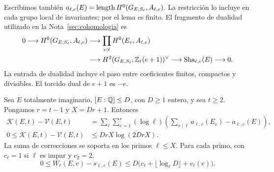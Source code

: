 Escribimos también
$a_{\ell,e}(E)=\operatorname{length} H^0(G_{E,S_\ell},A_{\ell,e})$.
La restricción lo incluye en cada grupo local de invariantes;
por el lema es finito. El fragmento de dualidad utilizado en la
Nota~\ref{sec:cohomologia} es
\begin{equation}
 \begin{split}
 0\longrightarrow H^0(G_{E,S_\ell},A_{\ell,e})
 &\longrightarrow\prod_{v\mid\ell}H^0(E_v,A_{\ell,e})\\
 &\longrightarrow H^2(G_{E,S_\ell},\mathbb{Z}_\ell(e+1))^\vee
 \longrightarrow\operatorname{Sha}_{\ell,e}(E)
 \longrightarrow0.
 \end{split}
 \label{eq:fu-dualidad}
\end{equation}
La entrada de dualidad incluye el paso entre coeficientes finitos,
compactos y divisibles. El torcido dual de $e+1$ es $-e$.

\begin{proposicion}
\label{prop:fu-presupuesto-exacto}
Sea $E$ totalmente imaginario, $[E:\mathbb{Q}]\le D$, con $D\ge1$ entero,
y sea $t\ge2$. Pongamos $r=t-1$ y $X=Dr+1$. Entonces
\begin{equation}
 \begin{aligned}
 \mathcal K(E,t)-\mathcal V(E,t)
 &=\sum_\ell\sum_{e=1}^{r}(\log\ell)
       \left(\sum_{v\mid\ell}a_{\ell,e}(E_v)-a_{\ell,e}(E)\right),\\
 0\le\mathcal K(E,t)-\mathcal V(E,t)
 &\le DrX\log(2DrX).
 \end{aligned}
 \label{eq:fu-correccion-global}
\end{equation}
La suma de correcciones se soporta en los primos $\ell\le X$.
Para cada primo, con $c_\ell=1$ si $\ell$ es impar y $c_2=2$,
\begin{equation}
 0\le W_\ell(E,e)-s_{\ell,e}(E)
 \le D\bigl(c_\ell+\lfloor\log_\ell D\rfloor+v_\ell(e)\bigr).
 \label{eq:fu-correccion-primo}
\end{equation}
\end{proposicion}

